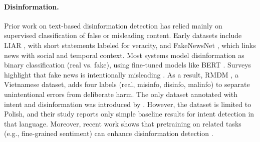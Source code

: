 \documentclass[11pt]{article}
\newcommand{\infotext}[1]{\textcolor{red!70!black}{\textbf{#1}}}
\begin{document}



\paragraph{Disinformation.}



Prior work on text-based disinformation detection has relied mainly on supervised classification of false or misleading content. Early datasets include LIAR \cite{wang2017liar}, with short statements labeled for veracity, and FakeNewsNet \cite{shu2020fakenewsnet}, which links news with social and temporal context. Most systems model disinformation as binary classification (real vs. fake), using fine-tuned models like BERT \cite{khan2021benchmark}. Surveys highlight that fake news is intentionally misleading \cite{shu2017fake}. As a result, RMDM \cite{nguyen2023rmdm}, a Vietnamese dataset, adds four labels (real, misinfo, disinfo, malinfo) to separate unintentional errors from deliberate harm. The only dataset annotated with intent and disinformation was introduced by \citet{modzelewski2024mipd}. However, the dataset is limited to Polish, and their study reports only simple baseline results for intent detection in that language. 
Moreover, recent work shows that pretraining on related tasks (e.g., fine-grained sentiment) can enhance disinformation detection \cite{pan2024enhancing}.  
\end{document}
